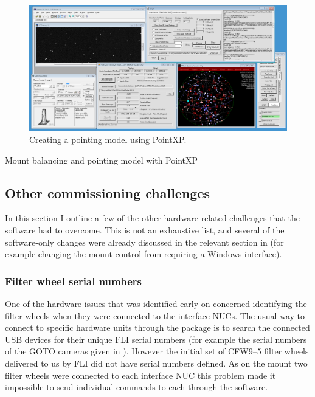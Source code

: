\begin{colsection}
\begin{colsection}
\begin{figure}[t]
    \begin{center}
        \includegraphics[width=\textwidth]{images/pointing_model.png}
    \end{center}
    \caption[Creating a pointing model using PointXP]{
        Creating a pointing model using PointXP.\@
    }\label{fig:pointing_model}
\end{figure}

Mount balancing and pointing model with PointXP

\end{colsection}


\newpage
\subsection{Other commissioning challenges}
\label{sec:challenges}
\begin{colsection}

In this section I outline a few of the other hardware-related challenges that the software had to overcome. This is not an exhaustive list, and several of the software-only changes were already discussed in the relevant section in  (for example changing the mount control from requiring a Windows interface).

\subsubsection{Filter wheel serial numbers}

One of the hardware issues that was identified early on concerned identifying the filter wheels when they were connected to the interface NUCs. The usual way to connect to specific hardware units through the  package is to search the connected USB devices for their unique FLI serial numbers (for example the serial numbers of the GOTO cameras given in ). However the initial set of CFW9--5 filter wheels delivered to us by FLI did not have serial numbers defined. As on the mount two filter wheels were connected to each interface NUC this problem made it impossible to send individual commands to each through the software.


\end{colsection}
\end{colsection}
